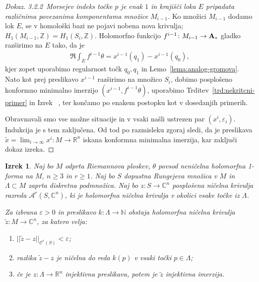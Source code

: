 \documentclass[12pt,a4paper,twoside]{article}
\theoremstyle{definition} %
\newenvironment{dokaz}[1][Dokaz]{\begin{proof}[#1]}{\end{proof}}
\theoremstyle{plain} %
\newtheorem{izrek}[definicija]{Izrek}
\numberwithin{equation}{section}  %
\newcommand{\R}{\mathbb R}
\newcommand{\N}{\mathbb N}
\newcommand{\C}{\mathbb C}
\begin{document}
\begin{dokaz}
\textit{3.2.2~Morsejev indeks točke $p$ je enak $1$ in krajišči loka $E$ pripadata različnima povezanima komponentama množice $M_{i-1}$.} \newline
Ko množici $M_{i-1}$ dodamo lok $E$, se v homološki bazi ne pojavi nobena nova krivulja; $H_{1}(M_{i-1}, \mathbb{Z}) = H_{1}(S_{i}, \mathbb{Z})$.
Holomorfno funkcijo $f^{i-1} \colon M_{i-1} \to \textup{\textbf{A}}_{*}$ gladko razširimo na $E$ tako, da je
\begin{gather*}
\Re \int_{E} f^{i-1} \theta = x^{i-1}(q_1) - x^{i-1}(q_0),
\end{gather*}
kjer zopet uporabimo regularnost točk $q_0, q_1$ in Lemo~\ref{lema:analog-gromova}.
Nato kot prej preslikavo $x^{i-1}$ razširimo na množico $S_{i}$, dobimo posplošeno konformno minimalno imerzijo $(x^{i-1}, f^{i-1} \theta)$, uporabimo Trditev~\ref{trd:nekritcni-primer} in Izrek ~\cite[Theorem~3.4.1]{alarcon2021minimal},
ter končamo po enakem postopku kot v dosedanjih primerih. \newline

Obravnavali smo vse možne situacije in v vsaki našli ustrezen par $(x^{i}, \varepsilon_{i})$. Indukcija je s tem zaključena. Od tod po razmisleku zgoraj sledi, da je preslikava $\tilde{x} = \lim_{i \to \infty} x^{i} \colon M \to \mathbb{R}^{n}$ iskana konformna minimalna imerzija, kar zaključi dokaz izreka.
\end{dokaz}

\begin{izrek} \label{izr:glavni-izrek-NC}
Naj bo $M$ odprta Riemannova ploskev, $\theta$ povsod neničelna holomorfna 1-forma na $M$, $n \geq 3$ in $r \geq 1$.
Naj bo $S$ dopustna Rungejeva množica v $M$ in $\Lambda \subset M$ zaprta diskretna podmnožica. 
Naj bo $z \colon S \to \C^{n}$ posplošena ničelna krivulja razreda $\mathcal{A}^{r}(S, \C^{n})$, ki je holomorfna ničelna krivulja v okolici vsake točke iz $\Lambda$.

Za izbrana $\varepsilon > 0$ in preslikavo $k \colon \Lambda \to \N$ obstaja holomorfna ničelna krivulja $\tilde{z} \colon M \to \C^{n}$, za katero velja:
\begin{enumerate}
\item $||\tilde{z} - z||_{\mathcal{C}^{r}(S)} < \varepsilon$;
\item razlika $\tilde{z}-z$ je ničelna do reda $k(p)$ v vsaki točki $p\in \Lambda$;
\item če je $z \colon \Lambda \to \R^{n}$ injektivna preslikava, potem je $\tilde{z}$ injektivna imerzija.
\end{enumerate}
\end{izrek}
\end{document}
